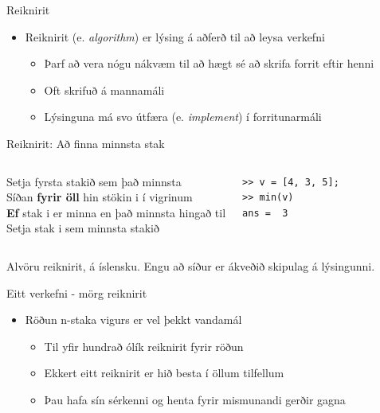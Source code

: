 \documentclass[handout]{beamer}
\begin{document}
\begin{frame}{Reiknirit}
\begin{itemize}
 \item Reiknirit (e. \emph{algorithm}) er lýsing á aðferð til að leysa verkefni
 \begin{itemize}
  \item Þarf að vera nógu nákvæm til að hægt sé að skrifa forrit eftir henni
  \item Oft skrifuð á mannamáli
  \item Lýsinguna má svo útfæra (e. \emph{implement}) í forritunarmáli
 \end{itemize}
\end{itemize}
\end{frame}

\begin{frame}[fragile]{Reiknirit: Að finna minnsta stak}
\begin{columns}
Setja fyrsta stakið sem það minnsta\\
Síðan \textbf{fyrir öll} hin stökin i í vigrinum\\
\quad \textbf{Ef} stak i er minna en það minnsta hingað til\\
\qquad Setja stak i sem minnsta stakið
\begin{verbatim}
>> v = [4, 3, 5];
>> min(v)
ans =  3
\end{verbatim}
\end{columns}
\vspace{1cm}
Alvöru reiknirit, á íslensku. Engu að síður er ákveðið skipulag á lýsingunni.
\end{frame}

\begin{frame}{Eitt verkefni - mörg reiknirit}
\begin{itemize}
 \item Röðun n-staka vigurs er vel þekkt vandamál
 \begin{itemize}
  \item Til yfir hundrað ólík reiknirit fyrir röðun
  \item Ekkert eitt reiknirit er hið besta í öllum tilfellum
  \item Þau hafa sín sérkenni og henta fyrir mismunandi gerðir gagna
 \end{itemize}
\end{itemize}
\end{frame}
\end{document}
